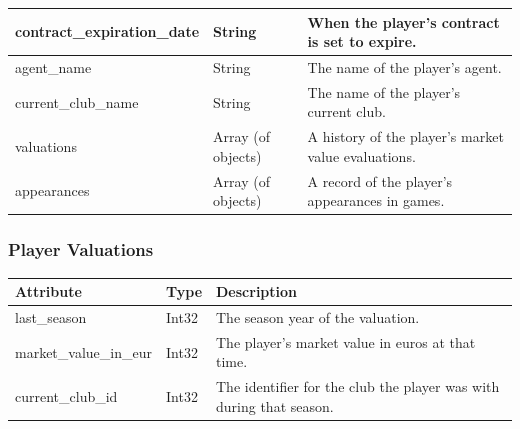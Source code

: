 \documentclass{Configuration_Files/PoliMi3i_thesis}
\begin{document}
\begin{tabular}{|l|l|p{8cm}|}
    contract\_expiration\_date     & String                   & When the player's contract is set to expire. \\ \hline
    agent\_name                    & String                   & The name of the player's agent. \\ \hline
    current\_club\_name            & String                   & The name of the player's current club. \\ \hline
    valuations                     & Array (of objects)       & A history of the player's market value evaluations. \\ \hline
    appearances                    & Array (of objects)       & A record of the player's appearances in games. \\ \hline
    \end{tabular}
\subsubsection{Player Valuations}
\begin{tabular}{|l|l|p{8cm}|}
    \hline
    \textbf{Attribute}             & \textbf{Type}           & \textbf{Description} \\ \hline
    last\_season                   & Int32                   & The season year of the valuation. \\ \hline
    market\_value\_in\_eur         & Int32                   & The player's market value in euros at that time. \\ \hline
    current\_club\_id              & Int32                   & The identifier for the club the player was with during that season. \\ \hline
    \end{tabular}
\end{document}
